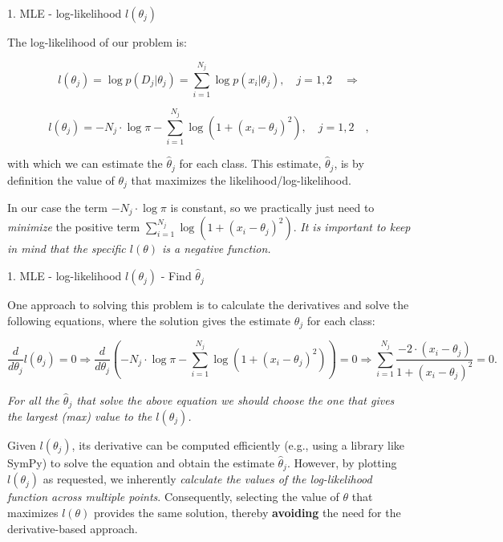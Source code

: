 \documentclass[aspectratio=169,xcolor=dvipsnames]{beamer}
\begin{document}

\begin{frame}{1. MLE - log-likelihood $l(\theta_j)$}

    The log-likelihood of our problem is:
    
    $$ l(\theta_j) = \log p(D_j | \theta_j) = \sum_{i=1}^{N_j} \log p(x_i | \theta_j), \quad j = 1, 2 \quad \Rightarrow$$
    
    $$ l(\theta_j) = - N_j \cdot \log \pi - \sum_{i=1}^{N_j} \log (1 + (x_i - \theta_j)^2), \quad j = 1, 2 \quad,$$

    with which we can estimate the $\hat{\theta}_j$ for each class. This estimate, $\hat{\theta}_j$, is by definition the value of $\theta_j$ that maximizes the likelihood/log-likelihood. 

    \vspace{5pt}
    
    In our case the term $- N_j \cdot \log \pi$ is constant, so we practically just need to \textit{minimize} the positive term $\sum_{i=1}^{N_j} \log (1 + (x_i - \theta_j)^2)$. \textit{It is important to keep in mind that the specific $l(\theta)$ is a negative function.}
    
\end{frame}


\begin{frame}{1. MLE - log-likelihood $l(\theta_j)$ - Find $\hat{\theta}_j$}

    One approach to solving this problem is to calculate the derivatives and solve the following equations, where the solution gives the estimate $\hat{\theta}_j$ for each class:

    $$ \frac{d}{d\theta_j} l(\theta_j) = 0 \Rightarrow \frac{d}{d\theta_j} \left(- N_j \cdot \log \pi - \sum_{i=1}^{N_j} \log (1 + (x_i - \theta_j)^2)\right) = 0 \Rightarrow  \sum_{i=1}^{N_j} \frac{-2 \cdot (x_i - \theta_j)}{1 + (x_i - \theta_j)^2} = 0.$$

    \begin{center}
        \textit{For all the $\hat{\theta}_j$ that solve the above equation we should choose the one that gives the largest (max) value to the $l(\theta_j)$.}
    \end{center}

    Given $l(\theta_j)$, its derivative can be computed efficiently (e.g., using a library like SymPy) to solve the equation and obtain the estimate $\hat{\theta}_j$. However, by plotting $l(\theta_j)$ as requested, we inherently \textit{calculate the values of the log-likelihood function across multiple points}. Consequently, selecting the value of $\theta$ that maximizes $l(\theta)$ provides the same solution, thereby \textbf{avoiding} the need for the derivative-based approach.
    
    
\end{frame}
\end{document}
